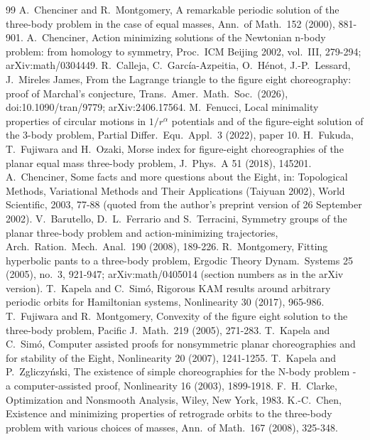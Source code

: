 \documentclass[11pt]{article}
\theoremstyle{definition}
\begin{document}
\begin{thebibliography}{99}
 A.~Chenciner and R.~Montgomery, A remarkable periodic solution of the three-body problem in the case of
equal masses, Ann.\ of Math.\ 152 (2000), 881-901.
 A.~Chenciner, Action minimizing solutions of the Newtonian n-body problem: from homology to symmetry,
Proc.\ ICM Beijing 2002, vol.~III, 279-294; arXiv:math/0304449.
 R.~Calleja, C.~Garc\'ia-Azpeitia, O.~H\'enot, J.-P.~Lessard, J.~Mireles James, From the Lagrange
triangle to the figure eight choreography: proof of Marchal's conjecture, Trans.\ Amer.\ Math.\ Soc.\ (2026),
doi:10.1090/tran/9779; arXiv:2406.17564.
 M.~Fenucci, Local minimality properties of circular motions in $1/r^\alpha$ potentials and of the
figure-eight solution of the 3-body problem, Partial Differ.\ Equ.\ Appl.\ 3 (2022), paper 10.
 H.~Fukuda, T.~Fujiwara and H.~Ozaki, Morse index for figure-eight choreographies of the planar equal
mass three-body problem, J.\ Phys.\ A 51 (2018), 145201.
 A.~Chenciner, Some facts and more questions about the Eight, in: Topological Methods, Variational
Methods and Their Applications (Taiyuan 2002), World Scientific, 2003, 77-88 (quoted from the author's preprint
version of 26 September 2002).
 V.~Barutello, D.~L.~Ferrario and S.~Terracini, Symmetry groups of the planar three-body problem and
action-minimizing trajectories, Arch.\ Ration.\ Mech.\ Anal.\ 190 (2008), 189-226.
 R.~Montgomery, Fitting hyperbolic pants to a three-body problem, Ergodic Theory Dynam.\ Systems 25
(2005), no.~3, 921-947; arXiv:math/0405014 (section numbers as in the arXiv version).
 T.~Kapela and C.~Sim\'o, Rigorous KAM results around arbitrary periodic orbits for Hamiltonian systems,
Nonlinearity 30 (2017), 965-986.
 T.~Fujiwara and R.~Montgomery, Convexity of the figure eight solution to the three-body problem, Pacific
J.\ Math.\ 219 (2005), 271-283.
 T.~Kapela and C.~Sim\'o, Computer assisted proofs for nonsymmetric planar choreographies and for stability
of the Eight, Nonlinearity 20 (2007), 1241-1255.
 T.~Kapela and P.~Zgliczy\'nski, The existence of simple choreographies for the N-body problem - a
computer-assisted proof, Nonlinearity 16 (2003), 1899-1918.
 F.~H.~Clarke, Optimization and Nonsmooth Analysis, Wiley, New York, 1983.
 K.-C.~Chen, Existence and minimizing properties of retrograde orbits to the three-body problem with
various choices of masses, Ann.\ of Math.\ 167 (2008), 325-348.

\end{thebibliography}
\end{document}
